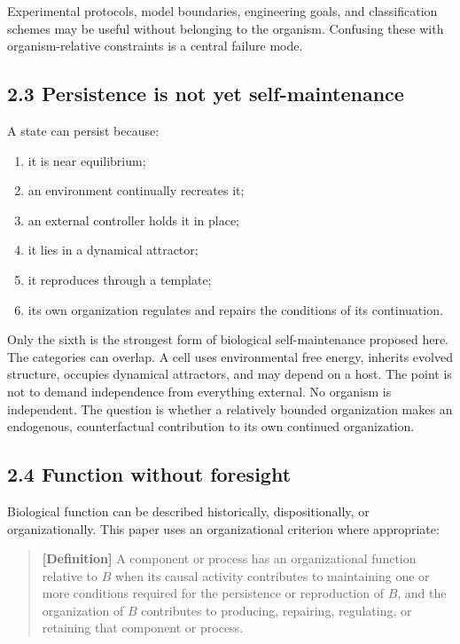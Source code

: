 \documentclass[
  11pt,
]{article}
\providecommand{\tightlist}{%
  \setlength{\itemsep}{0pt}\setlength{\parskip}{0pt}}
\begin{document}
Experimental protocols, model boundaries, engineering goals, and
classification schemes may be useful without belonging to the organism.
Confusing these with organism-relative constraints is a central failure
mode.

\subsection{2.3 Persistence is not yet
self-maintenance}\label{persistence-is-not-yet-self-maintenance}

A state can persist because:

\begin{enumerate}
\def\labelenumi{\arabic{enumi}.}
\tightlist
\item
  it is near equilibrium;
\item
  an environment continually recreates it;
\item
  an external controller holds it in place;
\item
  it lies in a dynamical attractor;
\item
  it reproduces through a template;
\item
  its own organization regulates and repairs the conditions of its
  continuation.
\end{enumerate}

Only the sixth is the strongest form of biological self-maintenance
proposed here. The categories can overlap. A cell uses environmental
free energy, inherits evolved structure, occupies dynamical attractors,
and may depend on a host. The point is not to demand independence from
everything external. No organism is independent. The question is whether
a relatively bounded organization makes an endogenous, counterfactual
contribution to its own continued organization.

\subsection{2.4 Function without
foresight}\label{function-without-foresight}

Biological function can be described historically, dispositionally, or
organizationally. This paper uses an organizational criterion where
appropriate:

\begin{quote}
\textbf{{[}Definition{]}} A component or process has an organizational
function relative to \(B\) when its causal activity contributes to
maintaining one or more conditions required for the persistence or
reproduction of \(B\), and the organization of \(B\) contributes to
producing, repairing, regulating, or retaining that component or
process.
\end{quote}
\end{document}
